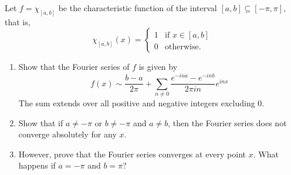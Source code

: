 \documentclass[12 pt, letterpaper]{hmcpset}
\begin{document}
\begin{problem}[S \& S \S 2.6 \#9.]
	Let $f = \chi_{[a, b]}$ be the characteristic function of the interval $[a, b] \subseteq [-\pi, \pi]$, that is,
	\[
		\chi_{[a, b]}(x) = \begin{cases}
			1 & \text{if } x \in [a, b] \\
			0 & \text{otherwise}.
		\end{cases}
	\]
	\begin{enumerate}
		\item Show that the Fourier series of $f$ is given by
			\[
				f(x) \sim \frac{b - a}{2 \pi} + \sum_{n \neq 0} \frac{e^{-i n a}  - e^{-i n b}}{2 \pi i n} e^{i n x}
			\]
			The sum extends over all positive and negative integers excluding $0$.
		\item Show that if $a \neq -\pi$ or $b \neq -\pi$ and $a \neq b$, then the Fourier series does not converge absolutely for any $x$.
		\item However, prove that the Fourier series converges at every point $x$. What happens if $a = - \pi$ and $b = \pi$?
	\end{enumerate}
\end{problem}
\end{document}
